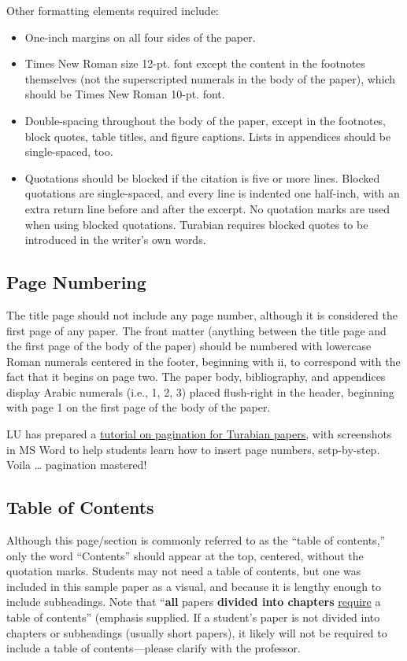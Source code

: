\documentclass[raggedright]{turabian-researchpaper}
\newcommand*{\bluehref}[2]{\href{#1}{\color{blue}\ul{#2}}}
\begin{document}
Other formatting elements required include:
\begin{itemize}
\item One-inch margins on all four sides of the paper.
\item Times New Roman size 12-pt. font except the content in the footnotes
  themselves (not the superscripted numerals in the body of the paper), which
  should be Times New Roman 10-pt. font.
\item Double-spacing throughout the body of the paper, except in the footnotes,
  block quotes, table titles, and figure captions. Lists in appendices should be
  single-spaced, too.\autocite[373]{Turabian}
\item Quotations should be blocked if the citation is five or more lines.
  Blocked quotations are single-spaced, and every line is indented one
  half-inch, with an extra return line before and after the excerpt. No
  quotation marks are used when using blocked quotations. Turabian requires
  blocked quotes to be introduced in the writer's own
  words.\autocite[349]{Turabian}
\end{itemize}

\subsection{Page Numbering}

The title page should not include any page number, although it is considered the
first page of any paper. The front matter (anything between the title page and
the first page of the body of the paper) should be numbered with lowercase Roman
numerals centered in the footer, beginning with ii, to correspond with the fact
that it begins on page two. The paper body, bibliography, and appendices display
Arabic numerals (i.e., 1, 2, 3) placed flush-right in the
header,\autocite[374]{Turabian} beginning with page 1 on the first page of the
body of the paper.

LU has prepared a
\bluehref{http://www.liberty.edu/media/1171/CMO_-_Pagination_Tutorial_for_Turabian_-_edited_by_Sam_-_02022017.pdf}{tutorial
on pagination for Turabian papers}, with screenshots in MS Word to help students
learn how to insert page numbers, setp-by-step. Voila \dots{} pagination
mastered!

\subsection{Table of Contents}

Although this page/section is commonly referred to as the ``table of contents,''
only the word ``Contents'' should appear at the top, centered, without the
quotation marks. Students may not need a table of contents, but one was included
in this sample paper as a visual, and because it is lengthy enough to include
subheadings. Note that ``\textbf{all} papers \textbf{divided into chapters}
\ul{require} a table of contents'' (emphasis supplied.\autocite[380]{Turabian}
If a student's paper is not divided into chapters or subheadings (usually short
papers), it likely will not be required to include a table of contents---please
clarify with the professor.
\end{document}
